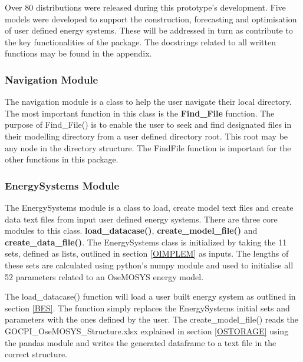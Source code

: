 \documentclass[12pt]{article}
\begin{document}
Over 80 distributions were released during this prototype's development. 
Five models were developed to support the construction, forecasting and optimisation of user defined energy systems.
These will be addressed in turn as contribute to the key functionalities of the package.
The docstrings related to all written functions may be found in the appendix.

\subsubsection{Navigation Module}
The navigation module is a class to help the user navigate their local directory. 
The most important function in this class is the \textbf{Find\_File} function.
The purpose of Find\_File() is to enable the user to seek and find designated files in their modelling directory from a user defined directory root.
This root may be any node in the directory structure. 
The FindFile function is important for the other functions in this package.

\subsubsection{EnergySystems Module} \label{ESM}
The EnergySystems module is a class to load, create model text files and create data text files from input user defined energy systems. 
There are three core modules to this class. \textbf{load\_datacase()}, \textbf{create\_model\_file()} and \textbf{create\_data\_file()}.
The EnergySystems class is initialized by taking the 11 sets, defined as lists, outlined in section \ref{OIMPLEM} as inputs. 
The lengths of these sets are calculated using python's numpy module and used to initialise all 52 parameters related to an OseMOSYS energy model.

The load\_datacase() function will load a user built energy system as outlined in section \ref{BES}. 
The function simply replaces the EnergySystems initial sets and parameters with the ones defined by the user.
The create\_model\_file() reads the GOCPI\_OseMOSYS\_Structure.xlsx explained in section \ref{OSTORAGE} using the pandas module and writes the generated dataframe to a text file in the correct structure.
\end{document}
